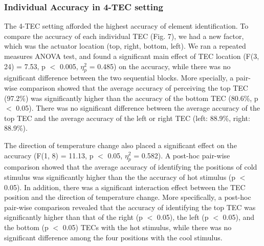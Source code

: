 \documentclass[preprint,12pt]{elsarticle}
\begin{document}
\subsubsection{Individual Accuracy in 4-TEC setting}
The 4-TEC setting afforded the highest accuracy of element identification. To compare the accuracy of each individual TEC (Fig. 7), we had a new factor, which was the actuator location (top, right, bottom, left). We ran a repeated measures ANOVA test, and found a significant main effect of TEC location (F(3, 24) = 7.53, p $<$ 0.005, $\eta_p^2$ = 0.485) on the accuracy, while there was no significant difference between the two sequential blocks. More specially, a pair-wise comparison showed that the average accuracy of perceiving the top TEC (97.2\%) was significantly higher than the accuracy of the bottom TEC (80.6\%, p $<$ 0.05). There was no significant difference between the average accuracy of the top TEC and the average accuracy of the left or right TEC (left: 88.9\%, right: 88.9\%).

The direction of temperature change also placed a significant effect on the accuracy (F(1, 8) = 11.13, p $<$ 0.05, $\eta_p^2$ = 0.582). A post-hoc pair-wise comparison showed that the average accuracy of identifying the positions of cold stimulus was significantly higher than the the accuracy of hot stimulus (p $<$ 0.05). In addition, there was a significant interaction effect between the TEC position and the direction of temperature change. More specifically, a post-hoc pair-wise comparison revealed that the accuracy of identifying the top TEC was significantly higher than that of the right (p $<$ 0.05), the left (p $<$ 0.05), and the bottom (p $<$ 0.05) TECs with the hot stimulus, while there was no significant difference among the four positions with the cool stimulus.
\end{document}

